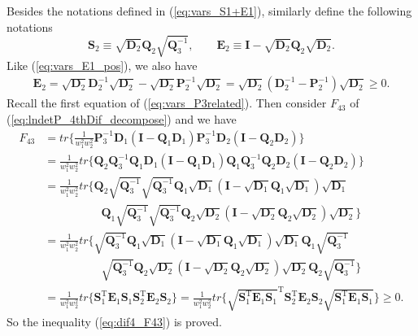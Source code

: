 \documentclass[12pt]{article}
\begin{document}
Besides the notations defined in (\ref{eq:vars_S1+E1}), similarly define the following notations
\begin{equation}  \label{eq:vars_S2+E2}
\mathbf{S}_2 \equiv \sqrt{\mathbf{D}_2} \mathbf{Q}_2 \sqrt{\mathbf{Q}_3^{-1}}, \qquad \mathbf{E}_2 \equiv \mathbf{I} - \sqrt{\mathbf{D}_2} \mathbf{Q}_2 \sqrt{\mathbf{D}_2}.
\end{equation}
Like (\ref{eq:vars_E1_pos}), we also have
\begin{align}  \label{eq:vars_E2_pos}
\mathbf{E}_2 = \sqrt{\mathbf{D}_2} \mathbf{D}_2^{-1} \sqrt{\mathbf{D}_2} - \sqrt{\mathbf{D}_2} \mathbf{P}_2^{-1} \sqrt{\mathbf{D}_2} = \sqrt{\mathbf{D}_2} (\mathbf{D}_2^{-1} - \mathbf{P}_2^{-1}) \sqrt{\mathbf{D}_2} \geq 0.
\end{align}
Recall the first equation of (\ref{eq:vars_P3related}). Then consider $F_{43}$ of (\ref{eq:lndetP_4thDif_decompose}) and we have
\begin{align*}
F_{43} &= tr\{ \frac{1}{w_1^2 w_2^2} \mathbf{P}_3^{-1} \mathbf{D}_1 (\mathbf{I} - \mathbf{Q}_1 \mathbf{D}_1) \mathbf{P}_3^{-1} \mathbf{D}_2 (\mathbf{I} - \mathbf{Q}_2 \mathbf{D}_2) \}  \\
  &= \frac{1}{w_1^2 w_2^2} tr\{ \mathbf{Q}_2 \mathbf{Q}_3^{-1} \mathbf{Q}_1 \mathbf{D}_1 (\mathbf{I} - \mathbf{Q}_1 \mathbf{D}_1) \mathbf{Q}_1 \mathbf{Q}_3^{-1} \mathbf{Q}_2 \mathbf{D}_2 (\mathbf{I} - \mathbf{Q}_2 \mathbf{D}_2) \}  \\
  &= \frac{1}{w_1^2 w_2^2} tr\{ \mathbf{Q}_2 \sqrt{\mathbf{Q}_3^{-1}} \sqrt{\mathbf{Q}_3^{-1}} \mathbf{Q}_1 \sqrt{\mathbf{D}_1} (\mathbf{I} - \sqrt{\mathbf{D}_1} \mathbf{Q}_1 \sqrt{\mathbf{D}_1}) \sqrt{\mathbf{D}_1}  \\
  & \qquad \qquad \quad \mathbf{Q}_1 \sqrt{\mathbf{Q}_3^{-1}} \sqrt{\mathbf{Q}_3^{-1}} \mathbf{Q}_2 \sqrt{\mathbf{D}_2} (\mathbf{I} - \sqrt{\mathbf{D}_2} \mathbf{Q}_2 \sqrt{\mathbf{D}_2}) \sqrt{\mathbf{D}_2} \}  \\
  &= \frac{1}{w_1^2 w_2^2} tr\{ \sqrt{\mathbf{Q}_3^{-1}} \mathbf{Q}_1 \sqrt{\mathbf{D}_1} (\mathbf{I} - \sqrt{\mathbf{D}_1} \mathbf{Q}_1 \sqrt{\mathbf{D}_1}) \sqrt{\mathbf{D}_1} \mathbf{Q}_1 \sqrt{\mathbf{Q}_3^{-1}}  \\
  & \qquad \qquad \quad \sqrt{\mathbf{Q}_3^{-1}} \mathbf{Q}_2 \sqrt{\mathbf{D}_2} (\mathbf{I} - \sqrt{\mathbf{D}_2} \mathbf{Q}_2 \sqrt{\mathbf{D}_2}) \sqrt{\mathbf{D}_2} \mathbf{Q}_2 \sqrt{\mathbf{Q}_3^{-1}} \}  \\
  &= \frac{1}{w_1^2 w_2^2} tr\{ \mathbf{S}_1^{\mathrm{T}} \mathbf{E}_1 \mathbf{S}_1 \mathbf{S}_2^{\mathrm{T}} \mathbf{E}_2 \mathbf{S}_2 \} = \frac{1}{w_1^2 w_2^2} tr\{ \sqrt{\mathbf{S}_1^{\mathrm{T}} \mathbf{E}_1 \mathbf{S}_1}^{\mathrm{T}} \mathbf{S}_2^{\mathrm{T}} \mathbf{E}_2 \mathbf{S}_2 \sqrt{\mathbf{S}_1^{\mathrm{T}} \mathbf{E}_1 \mathbf{S}_1} \}  \geq 0.
\end{align*}
So the inequality (\ref{eq:dif4_F43}) is proved.
\end{document}
